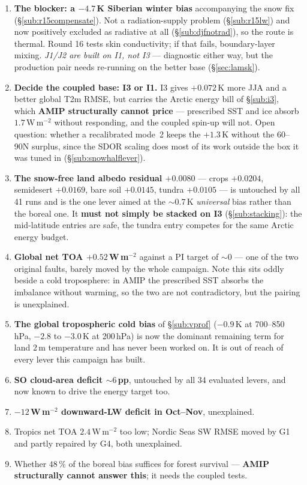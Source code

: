 \documentclass[10pt]{article}
\begin{document}
\begin{enumerate}\itemsep2pt
\item \textbf{The blocker: a $-4.7$\,K Siberian winter bias} accompanying the snow fix
  (\S\ref{sub:r15compensate}). Not a radiation-supply problem (\S\ref{sub:r15lw}) and now
  positively excluded as radiative at all (\S\ref{sub:djfnotrad}), so the route is thermal.
  Round 16 tests skin conductivity; if that fails, boundary-layer mixing. \emph{J1/J2 are
  built on I1, not I3} --- diagnostic either way, but the production pair needs re-running on
  the better base (\S\ref{sec:lamsk}).
\item \textbf{Decide the coupled base: I3 or I1.} I3 gives $+0.072$\,K more JJA and a better
  global T2m RMSE, but carries the Arctic energy bill of \S\ref{sub:i3}, which \textbf{AMIP
  structurally cannot price} --- prescribed SST and ice absorb $1.7$\,W\,m$^{-2}$ without
  responding, and the coupled spin-up will not. Open question: whether a recalibrated mode~2
  keeps the $+1.3$\,K without the 60--90N surplus, since the SDOR scaling does most of its
  work outside the box it was tuned in (\S\ref{sub:snowhalflever}).
\item \textbf{The snow-free land albedo residual $+0.0080$} --- crops $+0.0204$, semidesert
  $+0.0169$, bare soil $+0.0145$, tundra $+0.0105$ --- is untouched by all 41 runs and is the
  one lever aimed at the ${\sim}0.7$\,K \emph{universal} bias rather than the boreal one. It
  \textbf{must not simply be stacked on I3} (\S\ref{sub:stacking}): the mid-latitude entries
  are safe, the tundra entry competes for the same Arctic energy budget.
\item \textbf{Global net TOA $+0.52$\,W\,m$^{-2}$} against a PI target of $\sim0$ --- one of the
  two original faults, barely moved by the whole campaign. Note this sits oddly beside a cold
  troposphere: in AMIP the prescribed SST absorbs the imbalance without warming, so the two are
  not contradictory, but the pairing is unexplained.
\item \textbf{The global tropospheric cold bias} of \S\ref{sub:vprof} ($-0.9$\,K at 700--850\,hPa,
  $-2.8$ to $-3.0$\,K at 200\,hPa) is now the dominant remaining term for land 2\,m temperature
  and has never been worked on. It is out of reach of every lever this campaign has built.
\item \textbf{SO cloud-area deficit ${\sim}6$\,pp}, untouched by all 34 evaluated levers, and now
  known to drive the energy target too.
\item \textbf{$-12$\,W\,m$^{-2}$ downward-LW deficit in Oct--Nov}, unexplained.
\item Tropics net TOA $2.4$\,W\,m$^{-2}$ too low; Nordic Seas SW RMSE moved by G1 and partly
  repaired by G4, both unexplained.
\item Whether $48\,\%$ of the boreal bias suffices for forest survival --- \textbf{AMIP
  structurally cannot answer this}; it needs the coupled tests.
\end{enumerate}
\end{document}
